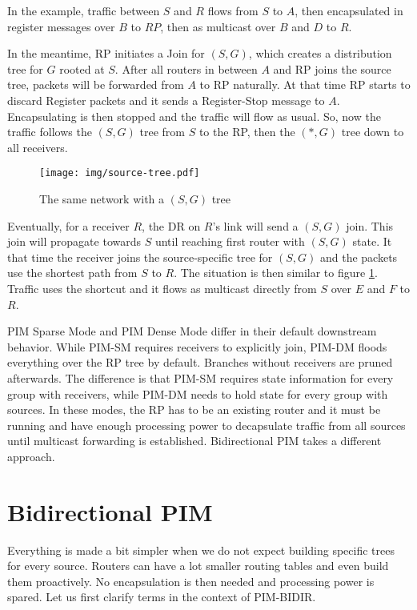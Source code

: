 In the example, traffic between $S$ and $R$ flows from $S$ to $A$, then
encapsulated in register messages over $B$ to $RP$, then as multicast over $B$
and $D$ to $R$.

In the meantime, RP initiates a Join for $(S, G)$, which creates a distribution
tree for $G$ rooted at $S$. After all routers in between $A$ and RP joins the
source tree, packets will be forwarded from $A$ to RP naturally. At that time
RP starts to discard Register packets and it sends a Register-Stop message to
$A$. Encapsulating is then stopped and the traffic will flow as usual. So, now
the traffic follows the $(S,G)$ tree from $S$ to the RP, then the $(*,G)$ tree
down to all receivers.

\begin{figure}[htp]
\centering
\texttt{[image: img/source-tree.pdf]}
\caption{The same network with a $(S,G)$ tree}
\label{sg-tree}
\end{figure}

Eventually, for a receiver $R$, the DR on $R$'s link will send a $(S, G)$ join.
This join will propagate towards $S$ until reaching first router with $(S,G)$
state. It that time the receiver joins the source-specific tree for $(S,G)$ and
the packets use the shortest path from $S$ to $R$. The situation is then similar to
figure \ref{sg-tree}. Traffic uses the shortcut and it flows as multicast
directly from $S$ over $E$ and $F$ to $R$.

PIM Sparse Mode and PIM Dense Mode differ in their default downstream behavior.
While PIM-SM requires receivers to explicitly join, PIM-DM floods everything
over the RP tree by default. Branches without receivers are pruned afterwards.
The difference is that PIM-SM requires state information for every group with
receivers, while PIM-DM needs to hold state for every group with sources.
In these modes, the RP has to be an existing router and it must be running and have
enough processing power to decapsulate traffic from all sources until multicast
forwarding is established. Bidirectional PIM takes a different approach.

\section{Bidirectional PIM}

Everything is made a bit simpler when we do not expect building specific trees
for every source. Routers can have a lot smaller routing tables and even build
them proactively. No encapsulation is then needed and processing power is
spared. Let us first clarify terms in the context of PIM-BIDIR.

